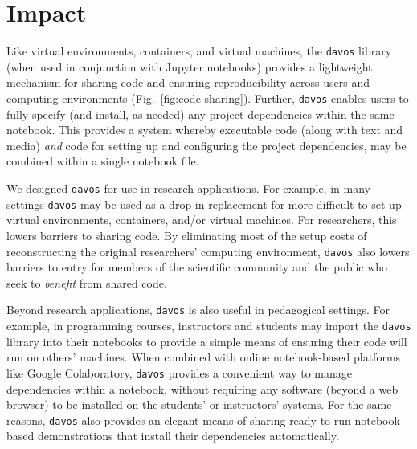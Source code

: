 \documentclass[preprint,12pt,a4paper]{elsarticle}
\begin{document}


\section{Impact}

Like virtual environments, containers, and virtual machines, the
\texttt{davos} library (when used in conjunction with Jupyter
notebooks) provides a lightweight mechanism for sharing code and
ensuring reproducibility across users and computing environments
(Fig.~\ref{fig:code-sharing}).  Further, \texttt{davos} enables users
to fully specify (and install, as needed) any project dependencies
within the same notebook.  This provides a system whereby executable
code (along with text and media) \textit{and} code for setting up and
configuring the project dependencies, may be combined within a single
notebook file.

We designed \texttt{davos} for use in research applications.  For
example, in many settings \texttt{davos} may be used as a drop-in
replacement for more-difficult-to-set-up virtual environments,
containers, and/or virtual machines.  For researchers, this lowers
barriers to sharing code.  By eliminating most of the setup costs
of reconstructing the original researchers' computing environment,
\texttt{davos} also lowers barriers to entry for members of
the scientific community and the public who seek to \textit{benefit}
from shared code.

Beyond research applications, \texttt{davos} is also useful in
pedagogical settings.  For example, in programming courses,
instructors and students may import the \texttt{davos} library into
their notebooks to provide a simple means of ensuring their code will
run on others' machines.  When combined with online notebook-based
platforms like Google Colaboratory, \texttt{davos} provides a
convenient way to manage dependencies within a notebook, without
requiring any software (beyond a web browser) to be installed on the
students' or instructors' systems.  For the same reasons,
\texttt{davos} also provides an elegant means of sharing ready-to-run
notebook-based demonstrations that install their dependencies
automatically.
\end{document}
